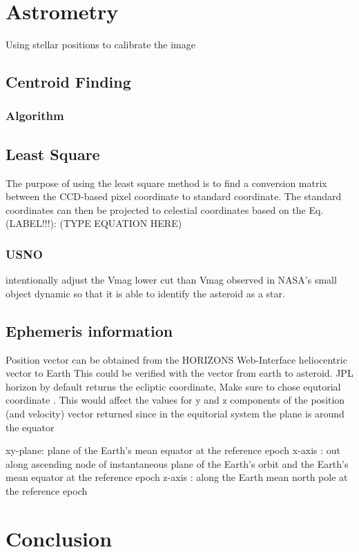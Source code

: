 \documentclass[authoryear, 12pt,5p, times]{elsarticle}
\begin{document}
\section{Astrometry}
Using stellar positions to calibrate the image
	\subsection{Centroid Finding}
		\subsubsection{Algorithm}
	\subsection{Least Square}
	The purpose of using the least square method is to find a conversion matrix between the CCD-based pixel coordinate to standard coordinate.
	The standard coordinates can then be projected to celestial coordinates based on the Eq. (LABEL!!!):
	(TYPE EQUATION HERE)
	\subsubsection{USNO}
	intentionally adjust the Vmag lower cut than Vmag observed in NASA's small object dynamic so that it is able to identify the asteroid as a star.
	\subsection{Ephemeris information}	
Position vector can be obtained from the HORIZONS Web-Interface 
heliocentric vector to Earth
This could be verified with the vector from earth to asteroid.
	JPL horizon by default returns the ecliptic coordinate, Make sure to chose equtorial coordinate . This would affect the values for y and z components of the position (and velocity) vector returned since in the equitorial system the plane is around the equator
	
	 xy-plane: plane of the Earth's mean equator at the reference epoch
    x-axis  : out along ascending node of instantaneous plane of the Earth's
              orbit and the Earth's mean equator at the reference epoch
    z-axis  : along the Earth mean north pole at the reference epoch
    
\section{Conclusion}
\end{document}
